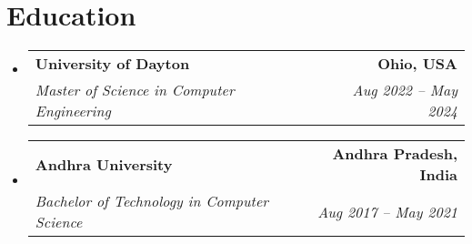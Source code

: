 \documentclass[letterpaper,11pt]{article}
\makeatletter
\newcommand{\resumeSubheading}[4]{
  \vspace{-2pt}\item
	\begin{tabular*}{1.0\textwidth}[t]{l@{\extracolsep{\fill}}r}
  	\textbf{#1} & \textbf{\small #2} \\
  	\textit{\small#3} & \textit{\small #4} \\
	\end{tabular*}\vspace{-7pt}
}
\newcommand{\resumeSubHeadingListStart}{\begin{itemize}[leftmargin=0.0in, label={}]}
\newcommand{\resumeSubHeadingListEnd}{\end{itemize}}
\makeatother
\begin{document}
    \section{Education}
      \resumeSubHeadingListStart
        \resumeSubheading
          {University of Dayton}{Ohio, USA}
          {Master of Science in Computer Engineering}{Aug 2022 -- May 2024}
        \resumeSubheading
          {Andhra University}{Andhra Pradesh, India}
          {Bachelor of Technology in Computer Science}{Aug 2017 -- May 2021}
      \resumeSubHeadingListEnd
    
\end{document}
